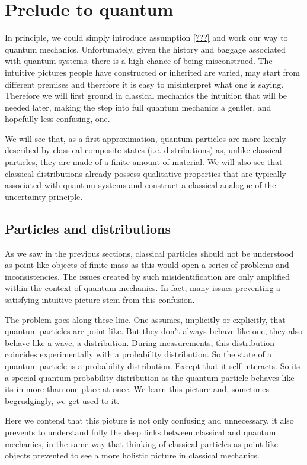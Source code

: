 \documentclass[aps,pra,10pt,twocolumn,floatfix,nofootinbib]{revtex4-1}
\numberwithin{equation}{section}
\theoremstyle{definition}
\begin{document}
\section{Prelude to quantum}

In principle, we could simply introduce assumption \ref{???} and work our way to quantum mechanics. Unfortunately, given the history and baggage associated with quantum systems, there is a high chance of being misconstrued. The intuitive pictures people have constructed or inherited are varied, may start from different premises and therefore it is easy to misinterpret what one is saying. Therefore we will first ground in classical mechanics the intuition that will be needed later, making the step into full quantum mechanics a gentler, and hopefully less confusing, one.

We will see that, as a first approximation, quantum particles are more keenly described by classical composite states (i.e. distributions) as, unlike classical particles, they are made of a finite amount of material. We will also see that classical distributions already possess qualitative properties that are typically associated with quantum systems and construct a classical analogue of the uncertainty principle.

\subsection{Particles and distributions}

As we saw in the previous sections, classical particles should not be understood as point-like objects of finite mass as this would open a series of problems and inconsistencies. The issues created by such misidentification are only amplified within the context of quantum mechanics. In fact, many issues preventing a satisfying intuitive picture stem from this confusion.

The problem goes along these line. One assumes, implicitly or explicitly, that quantum particles are point-like. But they don't always behave like one, they also behave like a wave, a distribution. During measurements, this distribution coincides experimentally with a probability distribution. So the state of a quantum particle is a probability distribution. Except that it self-interacts. So its a special quantum probability distribution as the quantum particle behaves like its in more than one place at once. We learn this picture and, sometimes begrudgingly, we get used to it.

Here we contend that this picture is not only confusing and unnecessary, it also prevents to understand fully the deep links between classical and quantum mechanics, in the same way that thinking of classical particles as point-like objects prevented to see a more holistic picture in classical mechanics.
\end{document}
